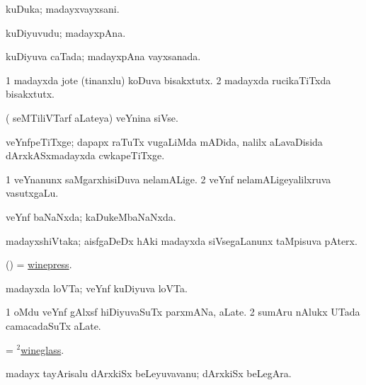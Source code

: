 \bentry
{}
\gl{\nA}
\bmng
kuDuka; madayxvayxsani. 
\emng
\eentry

\bentry
{} 
\gl{\nA}
\expl{}
\bmng
kuDiyuvudu; madayxpAna. 
\emng
\eentry

\bentry
{} 
\gl{\gu}
\expl{}
\bmng
kuDiyuva caTada; madayxpAna vayxsanada. 
\emng
\eentry

\bentry
{}
\gl{\nA}
\bmng
\bnum
\num{1} madayxda jote (tinanxlu) koDuva bisakxtutx. 
\num{2} madayxda rucikaTiTxda bisakxtutx. 
\enum
\emng
\eentry

\bentry
{} 
\gl{\nA}
\expl{}
\bmng
( seMTiliVTarf aLateya) veYnina siVse. 
\emng
\eentry

\bentry
{}
\gl{\nA}
\bmng
veYnfpeTiTxge; dapapx raTuTx \mo vugaLiMda mADida, nalilx aLavaDisida dArxkASxmadayxda cwkapeTiTxge. 
\emng
\eentry

\bentry
{}
\gl{\nA}
\bmng
\bnum
\num{1} veYnanunx saMgarxhisiDuva nelamALige. 
\num{2} veYnf nelamALigeyalilxruva vasutxgaLu. 
\enum
\emng
\eentry

\bentry
{}
\gl{\gu}
\bmng
veYnf baNaNxda; kaDukeMbaNaNxda. 
\emng
\eentry

\bentry
{}
\gl{\nA}
\bmng
madayxshiVtaka; aisfgaDeDx hAki madayxda siVsegaLanunx taMpisuva pAterx. 
\emng
\eentry

\bentry
{} 
\gl{\nA}
\expl{}
\bmng
(\pArxparx) = \hyperlink{winepress}{winepress}. 
\emng
\eentry

\bentry
{}
\gl{\nA}
\bmng
madayxda loVTa; veYnf kuDiyuva loVTa. 
\emng
\eentry

\bentry
{}
\gl{\nA}
\bmng
\bnum
\num{1} oMdu veYnf gAlxsf hiDiyuvaSuTx parxmANa, aLate. 
\num{2} sumAru nAlukx UTada camacadaSuTx aLate. 
\enum
\emng
\eentry

\bentry
{}
\gl{\nA}
\bmng
= \hyperlink{wineglass(2)}{$^2$wineglass}. 
\emng
\eentry

\bentry
{}
\gl{\nA}
\bmng
madayx tayArisalu dArxkiSx beLeyuvavanu; dArxkiSx beLegAra. 
\emng
\eentry

